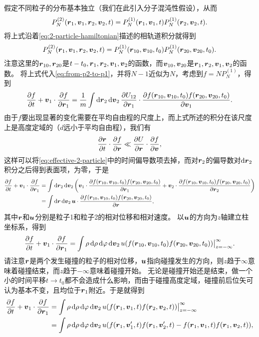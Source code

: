 \documentclass[hyperref, UTF8, a4paper]{ctexart}
\begin{document}
假定不同粒子的分布基本独立（我们在此引入分子混沌性假设），从而
\[
    P^{(2)}_N(\vb*{r}_1, \vb*{v}_1, \vb*{r}_2, \vb*{v}_2, t) = P^{(1)}_N(\vb*{r}_1, \vb*{v}_1, t) P^{(1)}_N(\vb*{r}_2, \vb*{v}_2, t).
\]
将上式沿着\eqref{eq:2-particle-hamiltonian}描述的相轨道积分就得到
\[
    P^{(2)}_N(\vb*{r}_1, \vb*{v}_1, \vb*{r}_2, \vb*{v}_2, t) = P^{(1)}_N(\vb*{r}_{10}, \vb*{v}_{10}, t_0) P^{(1)}_N(\vb*{r}_{20}, \vb*{v}_{20}, t_0).
\]
注意这里的$\vb*{r}_{10}, \vb*{r}_{20}$是$t-t_0,\vb*{r}_1,\vb*{r}_2,\vb*{v}_1, \vb*{v}_2$的函数，而$\vb*{v}_{10}, \vb*{v}_{20}$是$\vb*{r}_1,\vb*{r}_2,\vb*{v}_1, \vb*{v}_2$的函数。
将上式代入\eqref{eq:from-p2-to-p1}，并将$N-1$近似为$N$，考虑到$f=NP_N^{(1)}$，得到
\[
    \pdv{f}{t} + \vb*{v}_1 \cdot \pdv{f}{\vb*{r}_1} = \frac{1}{m} \int \dd{\vb*{r}_2} \dd{\vb*{v}_2} \pdv{U_{12}}{\vb*{r}_1} \cdot \pdv{f(\vb*{r}_{10}, \vb*{v}_{10}, t_0) f(\vb*{r}_{20}, \vb*{v}_{20}, t_0)}{\vb*{v}_1}.
\]
由于$f$要出现显著的变化需要在平均自由程的尺度上，而上式所述的积分在该尺度上是高度定域的（$d$远小于平均自由程），我们有
\[
    \pdv{\vb*{r}}{t} \cdot \pdv{f}{\vb*{r}} \ll \pdv{U}{\vb*{r}} \cdot \pdv{f}{\vb*{v}},
\]
这样可以将\eqref{eq:effective-2-particle}中的时间偏导数项去掉，而对$\vb*{r}_2$的偏导数对$\dd{\vb*{r}_2}$积分之后得到表面项，为零，于是
\[
    \begin{aligned}
        \pdv{f}{t} + \vb*{v}_1 \cdot \pdv{f}{\vb*{r}_1} &= \int \dd{\vb*{r}_2} \dd{\vb*{v}_2} \left( \vb*{v}_1 \cdot \pdv{f(\vb*{r}_{10}, \vb*{v}_{10}, t_0) f(\vb*{r}_{20}, \vb*{v}_{20}, t_0)}{\vb*{r}_1} + \vb*{v}_2 \cdot \pdv{f(\vb*{r}_{10}, \vb*{v}_{10}, t_0) f(\vb*{r}_{20}, \vb*{v}_{20}, t_0)}{\vb*{r}_2} \right) \\
        &= \int \dd{\vb*{r}} \dd{\vb*{v}_2} \vb*{u} \cdot \pdv{f(\vb*{r}_{10}, \vb*{v}_{10}, t_0) f(\vb*{r}_{20}, \vb*{v}_{20}, t_0)}{\vb*{r}},
    \end{aligned}
\]
其中$\vb*{r}$和$\vb*{u}$分别是粒子1和粒子2的相对位移和相对速度。
以$\vb*{u}$的方向为$z$轴建立柱坐标系，得到
\[
    \pdv{f}{t} + \vb*{v}_1 \cdot \pdv{f}{\vb*{r}_1} = \int \rho \dd{\rho} \dd{\varphi} \dd{\vb*{v}_2} u (f(\vb*{r}_{10}, \vb*{v}_{10}, t_0) f(\vb*{r}_{20}, \vb*{v}_{20}, t_0))\big|_{z=-\infty}^\infty.
\]
请注意$\vb*{r}$是两个发生碰撞的粒子的相对位移，$\vb*{u}$指向碰撞发生的方向，则$z$趋于$\infty$意味着碰撞结束，而$z$趋于$-\infty$意味着碰撞开始。
无论是碰撞开始还是结束，做一个小的时间平移$t \longrightarrow t_0$都不会造成什么影响，而由于碰撞高度定域，碰撞前后位矢可认为基本不变，且均位于$\vb*{r}_1$附近。于是就得到
\[
    \begin{aligned}
        \pdv{f}{t} + \vb*{v}_1 \cdot \pdv{f}{\vb*{r}_1} &= \int \rho \dd{\rho} \dd{\varphi} \dd{\vb*{v}_2} u (f(\vb*{r}_{1}, \vb*{v}_{1}, t) f(\vb*{r}_{2}, \vb*{v}_{2}, t))\big|_{z=-\infty}^\infty \\
        &= \int \rho \dd{\rho} \dd{\varphi} \dd{\vb*{v}_2} u (f(\vb*{r}_{1}, \vb*{v}'_{1}, t) f(\vb*{r}_{1}, \vb*{v}'_{2}, t) - f(\vb*{r}_{1}, \vb*{v}_{1}, t) f(\vb*{r}_{1}, \vb*{v}_{2}, t)),
    \end{aligned}
\]
\end{document}
